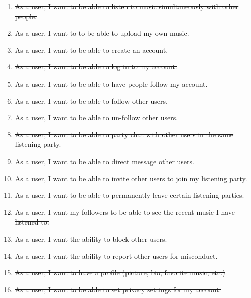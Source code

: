 \documentclass[11pt]{report}
\begin{document}
    \begin{enumerate}

    \item \st{As a user, I want to be able to listen to music simultaneously with other people.}
    
    \item \st{As a user, I want to to be able to upload my own music.}
        
    \item \st{As a user, I want to be able to create an account.}
    
    \item \st{As a user, I want to be able to log in to my account.}

    \item As a user, I want to be able to have people follow my account.

    \item As a user, I want to be able to follow other users.
    
    \item As a user, I want to be able to un-follow other users.
    
    \item \st{As a user, I want to be able to party chat with other users in the same listening party.}
    
    \item As a user, I want to be able to direct message other users.
    
    \item As a user, I want to be able to invite other users to join my listening party.
    
    \item As a user, I want to be able to permanently leave certain listening parties.
    
    \item \st{As a user, I want my followers to be able to see the recent music I have listened to.}
    
    \item As a user, I want the ability to block other users. 
    
    \item As a user, I want the ability to report other users for misconduct.
    
    \item \st{As a user, I want to have a profile (picture, bio, favorite music, etc.)}
    
    \item \st{As a user, I want to be able to set privacy settings for my account.}
    

\end{enumerate}
\end{document}
